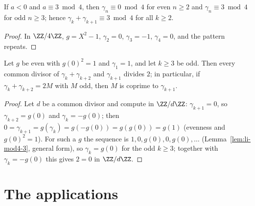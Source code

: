 \begin{lemma}
  \label{lem:li-mod4-3}
  \leanok
  If $a < 0$ and $a \equiv 3 \bmod 4$, then $\gamma_n \equiv 0 \bmod 4$ for even $n \ge 2$ and
  $\gamma_n \equiv 3 \bmod 4$ for odd $n \ge 3$; hence $\gamma_k + \gamma_{k+1} \equiv 3 \bmod 4$
  for all $k \ge 2$.
\end{lemma}
\begin{proof}
  \leanok
  In $\ZZ/4\ZZ$, $g = X^2 - 1$, $\gamma_2 = 0$, $\gamma_3 = -1$, $\gamma_4 = 0$, and the pattern
  repeats.
\end{proof}

\begin{lemma}
  \label{lem:li-cop}
  \leanok
  Let $g$ be even with $g(0)^2 = 1$ and $\gamma_1 = 1$, and let $k \ge 3$ be odd. Then every
  common divisor of $\gamma_k + \gamma_{k+2}$ and $\gamma_{k+1}$ divides $2$; in particular, if
  $\gamma_k + \gamma_{k+2} = 2M$ with $M$ odd, then $M$ is coprime to $\gamma_{k+1}$.
\end{lemma}
\begin{proof}
  \leanok
  Let $d$ be a common divisor and compute in $\ZZ/d\ZZ$: $\gamma_{k+1} = 0$, so
  $\gamma_{k+2} = g(0)$ and $\gamma_k = -g(0)$; then
  $0 = \gamma_{k+1} = g(\gamma_k) = g(-g(0)) = g(g(0)) = g(1)$ (evenness and $g(0)^2 = 1$). For
  such a $g$ the sequence is $1, 0, g(0), 0, g(0), \dots$ (Lemma~\ref{lem:li-mod4-3}, general
  form), so $\gamma_k = g(0)$ for the odd $k \ge 3$; together with $\gamma_k = -g(0)$ this gives
  $2 = 0$ in $\ZZ/d\ZZ$.
\end{proof}

\section{The applications}

